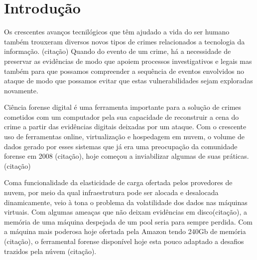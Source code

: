\documentclass[
	12pt,				%
	openright,			%
	twoside,			%
	a4paper,			%
	english,			%
	french,				%
	spanish,			%
	brazil,				%
	]{abntex2}
\begin{document}
\frenchspacing 


\imprimircapa

\imprimirfolhaderosto


\tableofcontents
\cleardoublepage


\textual

\chapter{Introdução}

Os crescentes avanços tecnilógicos que têm ajudado a vida do ser humano também trouxeram diversos novos tipos de crimes relacionados a tecnologia da informação. (citação)
Quando do evento de um crime, há a necessidade de preservar as evidências de modo que apoiem processos investigativos e legais mas também para que possamos compreender a sequência
de eventos envolvidos no ataque de modo que possamos evitar que estas vulnerabilidades sejam exploradas novamente.

\par

Ciência forense digital é uma ferramenta importante para a solução de crimes cometidos com um computador pela sua capacidade de reconstruir a cena do crime a partir das evidências
digitais deixadas por um ataque. Com o crescente uso de ferramentas online, virtualização e hospedagem em nuvem, o volume de dados gerado por esses sistemas que já era uma preocupação
da comunidade forense em 2008 (citação), hoje começou a inviabilizar algumas de suas práticas. (citação)

\par

Coma funcionalidade da elasticidade de carga ofertada pelos provedores de nuvem, por meio da qual infraestrutura pode ser alocada e desalocada dinamicamente, veio à tona o problema
da volatilidade dos dados nas máquinas virtuais. Com algumas ameaças que não deixam evidências em disco(citação), a memória de uma máquina despejada de um pool seria para sempre
perdida. Com a máquina mais poderosa hoje ofertada pela Amazon tendo 240Gb de memória (citação), o ferramental forense disponível hoje esta pouco adaptado a desafios trazidos 
pela núvem (citação).
\end{document}
